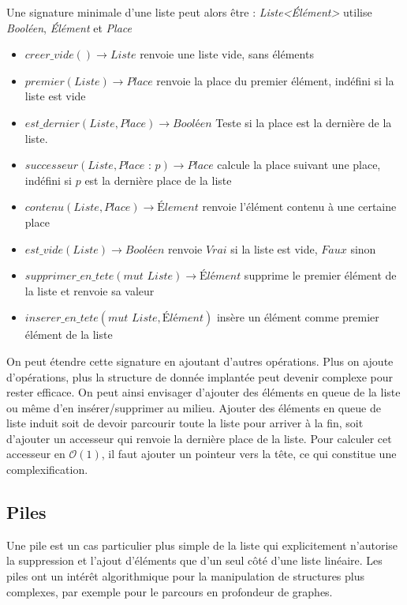 \documentclass[../../../main.tex]{subfiles}
\begin{document}
Une signature minimale d'une liste peut alors être :\newline
\textit{Liste\textless Élément\textgreater} utilise \textit{Booléen}, \textit{Élément} et \textit{Place}
\begin{itemize}
	\item $creer\_vide() \rightarrow Liste$ renvoie une liste vide, sans éléments
	\item $premier(Liste)\rightarrow Place$ renvoie la place du premier élément, indéfini si la liste est vide
	\item $est\_dernier(Liste, Place)\rightarrow \textit{Booléen}$ Teste si la place est la dernière de la liste.
	\item $successeur(Liste, \textit{Place : p})\rightarrow Place$ calcule la place suivant une place, indéfini si $p$ est la dernière place de la liste
	\item $contenu(Liste,Place) \rightarrow \textit{Élement}$ renvoie l'élément contenu à une certaine place
	\item $est\_vide(Liste)\rightarrow \textit{Booléen}$ renvoie $Vrai$ si la liste est vide, $Faux$ sinon
	\item $supprimer\_en\_tete(\textit{mut Liste})\rightarrow \textit{Élément}$ supprime le premier élément de la liste et renvoie sa valeur
	\item $inserer\_en\_tete(\textit{mut Liste}, \textit{Élément})$ insère un élément comme premier élément de la liste
\end{itemize}
On peut étendre cette signature en ajoutant d'autres opérations. Plus on ajoute d'opérations, plus la structure de donnée implantée peut devenir complexe pour rester efficace. On peut ainsi envisager d'ajouter des éléments en queue de la liste ou même d'en insérer/supprimer au milieu. \newline
Ajouter des éléments en queue de liste induit soit de devoir parcourir toute la liste pour arriver à la fin, soit d'ajouter un accesseur qui renvoie la dernière place de la liste. Pour calculer cet accesseur en $\mathcal{O}(1)$, il faut ajouter un pointeur vers la tête, ce qui constitue une complexification.
\subsection{Piles}
Une pile est un cas particulier plus simple de la liste qui explicitement n'autorise la suppression et l'ajout d'éléments que d'un seul côté d'une liste linéaire. Les piles ont un intérêt algorithmique pour la manipulation de structures plus complexes, par exemple pour le parcours en profondeur de graphes.
\end{document}
